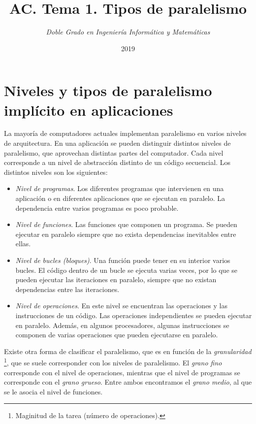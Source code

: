 \documentclass[11pt,twoside,a4paper]{article}
\begin{document}
\title{\Huge{\textbf{AC. Tema 1. Tipos de paralelismo}}}
\author{\textit{Doble Grado en Ingeniería Informática y Matemáticas}}
\date{2019}
\maketitle


\section{Niveles y tipos de paralelismo implícito en aplicaciones}
La mayoría de computadores actuales implementan paralelismo en varios niveles de arquitectura. En una
aplicación se pueden distinguir distintos niveles de paralelismo, que aprovechan distintas partes del
computador. Cada nivel corresponde a un nivel de abstracción distinto de un código secuencial. Los distintos
niveles son los siguientes:
\begin{itemize}[noitemsep]
	\item \textit{Nivel de programas}. Los diferentes programas que intervienen en una aplicación o en 
	diferentes aplicaciones que se ejecutan en paralelo. La dependencia entre varios programas es poco  
	probable.
	\item \textit{Nivel de funciones}. Las funciones que componen un programa. Se pueden ejecutar en
	paralelo siempre que no exista dependencias inevitables entre ellas.
	\item \textit{Nivel de bucles (bloques)}. Una función puede tener en su interior varios bucles. El
	código dentro de un bucle se ejecuta varias veces, por lo que se pueden ejecutar las iteraciones en 
	paralelo, siempre que no existan dependencias entre las iteraciones.
	\item \textit{Nivel de operaciones}. En este nivel se encuentran las operaciones y las instrucciones de
	un código. Las operaciones independientes se pueden ejecutar en paralelo. Además, en algunos 
	procesadores, algunas instrucciones se componen de varias operaciones que pueden ejecutarse en paralelo.
\end{itemize}

Existe otra forma de clasificar el paralelismo, que es en función de la \textit{granularidad}
\footnote{Maginitud de la tarea (número de operaciones).}, que se suele corresponder con los niveles de
paralelismo. El \textit{grano fino} corresponde con el nivel de operaciones, mientras que el nivel de
programas se corresponde con el \textit{grano grueso}. Entre ambos encontramos el \textit{grano medio}, al
que se le asocia el nivel de funciones.
\end{document}
